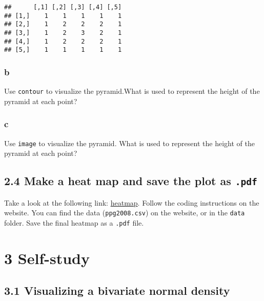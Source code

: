 \documentclass[]{article}
\begin{document}
\begin{verbatim}
##      [,1] [,2] [,3] [,4] [,5]
## [1,]    1    1    1    1    1
## [2,]    1    2    2    2    1
## [3,]    1    2    3    2    1
## [4,]    1    2    2    2    1
## [5,]    1    1    1    1    1
\end{verbatim}

\hypertarget{b-7}{%
\subsubsection{b}\label{b-7}}

Use \texttt{contour} to visualize the pyramid.What is used to represent
the height of the pyramid at each point?

\hypertarget{c-8}{%
\subsubsection{c}\label{c-8}}

Use \texttt{image} to visualize the pyramid. What is used to represent
the height of the pyramid at each point?

\hypertarget{make-a-heat-map-and-save-the-plot-as-.pdf}{%
\subsection{\texorpdfstring{2.4 Make a heat map and save the plot as
\texttt{.pdf}}{2.4 Make a heat map and save the plot as .pdf}}\label{make-a-heat-map-and-save-the-plot-as-.pdf}}

Take a look at the following link:
\href{http://flowingdata.com/2010/01/21/how-to-make-a-heatmap-a-quick-and-easy-solution/}{heatmap}.
Follow the coding instructions on the website. You can find the data
(\texttt{ppg2008.csv}) on the website, or in the \texttt{data} folder.
Save the final heatmap as a \texttt{.pdf} file.

\newpage

\hypertarget{self-study}{%
\section{3 Self-study}\label{self-study}}

\hypertarget{visualizing-a-bivariate-normal-density}{%
\subsection{3.1 Visualizing a bivariate normal
density}\label{visualizing-a-bivariate-normal-density}}
\end{document}

